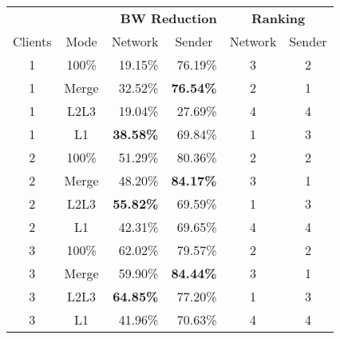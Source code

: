 \begin{table}[h]
\centering
\begin{tabular}{@{}ccrrcc@{}}
\toprule
        &                          & \multicolumn{2}{r}{\textbf{BW Reduction}}                & \multicolumn{2}{c}{\textbf{Ranking}} \\
        \cmidrule(lr){3-4}\cmidrule(lr){5-6}
Clients & \multicolumn{1}{c}{Mode} & \multicolumn{1}{c}{Network} & \multicolumn{1}{c}{Sender} & Network       & Sender      \\ \midrule
1       & 100\%                    & 19.15\%                    & 76.19\%                   & 3             & 2           \\
1       & Merge                    & 32.52\%                    & \textbf{76.54\%}          & 2             & 1           \\
1       & L2L3                     & 19.04\%                    & 27.69\%                   & 4             & 4           \\
1       & L1                       & \textbf{38.58\%}           & 69.84\%                   & 1             & 3           \\ \midrule
2       & 100\%                    & 51.29\%                    & 80.36\%                   & 2             & 2           \\
2       & Merge                    & 48.20\%                    & \textbf{84.17\%}          & 3             & 1           \\
2       & L2L3                     & \textbf{55.82\%}           & 69.59\%                   & 1             & 3           \\
2       & L1                       & 42.31\%                    & 69.65\%                   & 4             & 4           \\ \midrule
3       & 100\%                    & 62.02\%                    & 79.57\%                   & 2             & 2           \\
3       & Merge                    & 59.90\%                    & \textbf{84.44\%}          & 3             & 1           \\
3       & L2L3                     & \textbf{64.85\%}           & 77.20\%                   & 1             & 3           \\
3       & L1                       & 41.96\%                    & 70.63\%                   & 4             & 4           \\ \midrule

\end{tabular}
\end{table}

